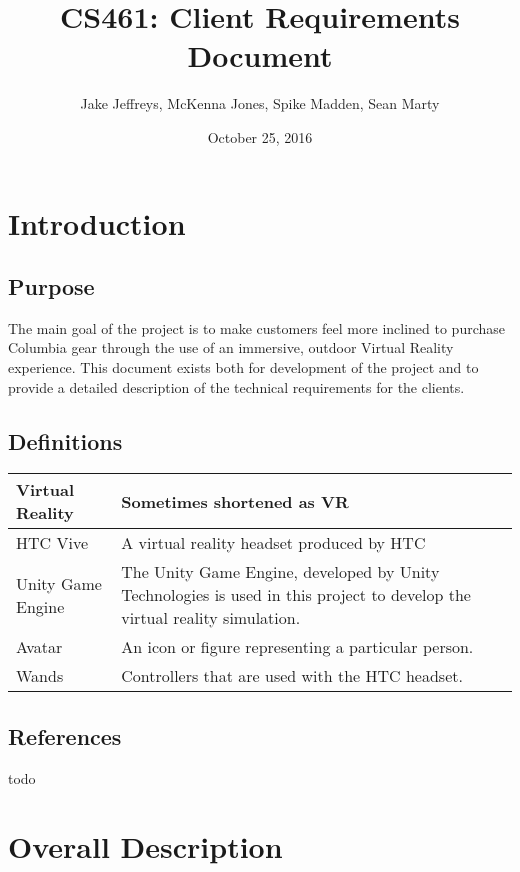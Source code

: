 \documentclass[10pt, oneside,onecolumn,draftclsnofoot]{IEEEtran}
\title{CS461: Client Requirements Document}
\author{Jake Jeffreys, McKenna Jones, Spike Madden, Sean Marty}
\date{October 25, 2016}
\begin{document}
\begin{titlepage}
\maketitle
\vspace{3cm}

\end{titlepage}

\section{Introduction}

\subsection{Purpose}
The main goal of the project is to make customers feel more inclined to purchase
Columbia gear through the use of an immersive, outdoor Virtual Reality
experience. This document exists both for development of the project and to provide a detailed description of the technical requirements for the clients.

\subsection{Definitions}
\begin{center}
	\begin{tabular}{| m{3cm} | m{9cm} |}
		\hline
		Virtual Reality & Sometimes shortened as VR \\
		\hline
		HTC Vive & A virtual reality headset produced by HTC \\
		\hline
		Unity Game Engine & The Unity Game Engine, developed by Unity Technologies
    is used in this project to develop the virtual reality simulation. \\
    \hline
    Avatar & An icon or figure representing a particular person. \\
    \hline
    Wands & Controllers that are used with the HTC headset. \\
		\end{tabular}
\end{center}

\subsection{References}
todo

\section{Overall Description}
\end{document}
